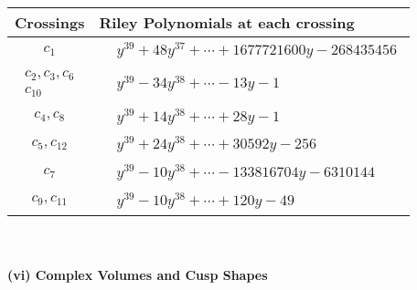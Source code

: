 \documentclass[1p]{elsarticle_modified}
\theoremstyle{definition}
\begin{document}
\begin{tabular}{m{50pt}|m{274pt}}
Crossings & \hspace{64pt}Riley Polynomials at each crossing \\
\hline $$\begin{aligned}c_{1}\end{aligned}$$&$\begin{aligned}
&y^{39}+48 y^{37}+\cdots+1677721600 y-268435456
\end{aligned}$\\
\hline $$\begin{aligned}c_{2},c_{3},c_{6}\\c_{10}\end{aligned}$$&$\begin{aligned}
&y^{39}-34 y^{38}+\cdots-13 y-1
\end{aligned}$\\
\hline $$\begin{aligned}c_{4},c_{8}\end{aligned}$$&$\begin{aligned}
&y^{39}+14 y^{38}+\cdots+28 y-1
\end{aligned}$\\
\hline $$\begin{aligned}c_{5},c_{12}\end{aligned}$$&$\begin{aligned}
&y^{39}+24 y^{38}+\cdots+30592 y-256
\end{aligned}$\\
\hline $$\begin{aligned}c_{7}\end{aligned}$$&$\begin{aligned}
&y^{39}-10 y^{38}+\cdots-133816704 y-6310144
\end{aligned}$\\
\hline $$\begin{aligned}c_{9},c_{11}\end{aligned}$$&$\begin{aligned}
&y^{39}-10 y^{38}+\cdots+120 y-49
\end{aligned}$\\
\hline
\end{tabular}\\~\\
\newpage\flushleft \textbf{(vi) Complex Volumes and Cusp Shapes}
\end{document}
